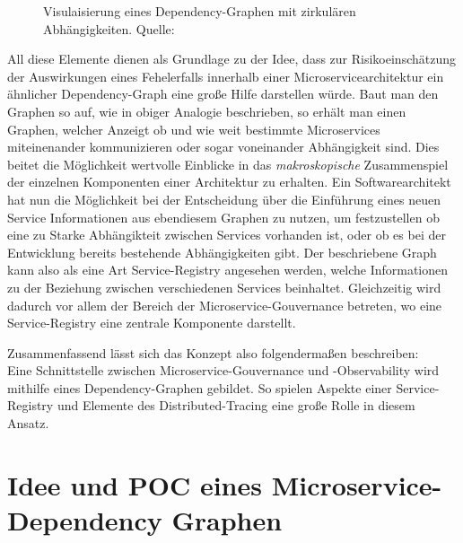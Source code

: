 \documentclass[
	12pt,
	BCOR=5mm,
	DIV=12,
	headinclude=on,
	footinclude=off,
	parskip=half,
	bibliography=totoc,
	listof=entryprefix,
	toc=listof,
	numbers=noenddot,
	plainfootsepline
]{scrreprt}
\begin{document}
\begin{figure}[h]
	\centering
	\caption[Dependency Graph]{Visulaisierung eines Dependency-Graphen mit zirkulären Abhängigkeiten. Quelle: \cite[]{GraphViz}}
	\label{fig:GraphViz}
\end{figure}
 All diese Elemente dienen als Grundlage zu der Idee, dass zur Risikoeinschätzung der Auswirkungen eines Fehelerfalls innerhalb einer Microservicearchitektur ein ähnlicher Dependency-Graph eine große Hilfe darstellen würde. Baut man den Graphen so auf, wie in obiger Analogie beschrieben, so erhält man einen Graphen, welcher Anzeigt ob und wie weit bestimmte Microservices miteinenander kommunizieren oder sogar voneinander Abhängigkeit sind. Dies beitet die Möglichkeit wertvolle Einblicke in das \textit{makroskopische} Zusammenspiel der einzelnen Komponenten einer Architektur zu erhalten. Ein Softwarearchitekt hat nun die Möglichkeit bei der Entscheidung über die Einführung eines neuen Service Informationen aus ebendiesem Graphen zu nutzen, um festzustellen ob eine zu Starke Abhängikteit zwischen Services vorhanden ist, oder ob es bei der Entwicklung bereits bestehende Abhängigkeiten gibt.
Der beschriebene Graph kann also als eine Art Service-Registry angesehen werden, welche Informationen zu der Beziehung zwischen verschiedenen Services beinhaltet. Gleichzeitig wird dadurch vor allem der Bereich der Microservice-Gouvernance betreten, wo eine Service-Registry eine zentrale Komponente darstellt. 

Zusammenfassend lässt sich das Konzept also folgendermaßen beschreiben: \\
Eine Schnittstelle zwischen Microservice-Gouvernance und -Observability wird mithilfe eines Dependency-Graphen gebildet. So spielen Aspekte einer Service-Registry und Elemente des Distributed-Tracing eine große Rolle in diesem Ansatz. 
\chapter{Idee und POC eines Microservice-Dependency Graphen}
\end{document}
